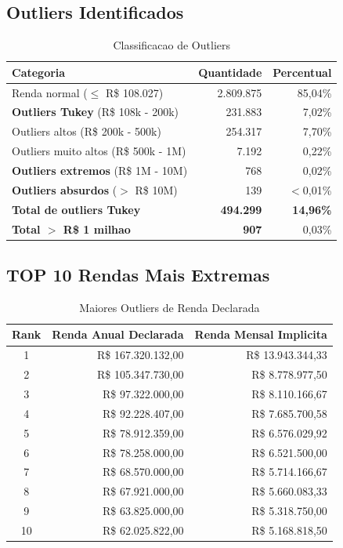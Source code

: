 \documentclass[11pt,a4paper]{article}
\begin{document}
\subsection{Outliers Identificados}

\begin{table}[H]
\centering
\caption{Classificacao de Outliers}
\label{tab:outliers}
\begin{tabular}{lrr}
\toprule
\textbf{Categoria} & \textbf{Quantidade} & \textbf{Percentual} \\
\midrule
Renda normal ($\leq$ R\$ 108.027) & 2.809.875 & 85,04\% \\
\midrule
\textbf{Outliers Tukey} (R\$ 108k - 200k) & 231.883 & 7,02\% \\
Outliers altos (R\$ 200k - 500k) & 254.317 & 7,70\% \\
Outliers muito altos (R\$ 500k - 1M) & 7.192 & 0,22\% \\
\textbf{Outliers extremos} (R\$ 1M - 10M) & 768 & 0,02\% \\
\textbf{Outliers absurdos} ($>$ R\$ 10M) & 139 & $<$0,01\% \\
\midrule
\textbf{Total de outliers Tukey} & \textbf{494.299} & \textbf{14,96\%} \\
\textbf{Total $>$ R\$ 1 milhao} & \textbf{907} & 0,03\% \\
\bottomrule
\end{tabular}
\end{table}

\subsection{TOP 10 Rendas Mais Extremas}

\begin{table}[H]
\centering
\caption{Maiores Outliers de Renda Declarada}
\label{tab:top10}
\begin{tabular}{crr}
\toprule
\textbf{Rank} & \textbf{Renda Anual Declarada} & \textbf{Renda Mensal Implicita} \\
\midrule
1 & R\$ 167.320.132,00 & R\$ 13.943.344,33 \\
2 & R\$ 105.347.730,00 & R\$ 8.778.977,50 \\
3 & R\$ 97.322.000,00 & R\$ 8.110.166,67 \\
4 & R\$ 92.228.407,00 & R\$ 7.685.700,58 \\
5 & R\$ 78.912.359,00 & R\$ 6.576.029,92 \\
6 & R\$ 78.258.000,00 & R\$ 6.521.500,00 \\
7 & R\$ 68.570.000,00 & R\$ 5.714.166,67 \\
8 & R\$ 67.921.000,00 & R\$ 5.660.083,33 \\
9 & R\$ 63.825.000,00 & R\$ 5.318.750,00 \\
10 & R\$ 62.025.822,00 & R\$ 5.168.818,50 \\
\bottomrule
\end{tabular}
\end{table}
\end{document}
